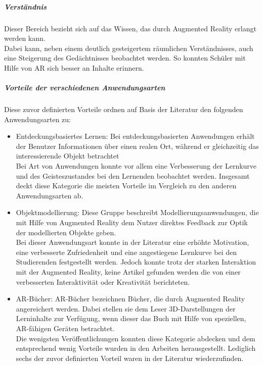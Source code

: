 \subparagraph{Verständnis}
Dieser Bereich bezieht sich auf das Wissen, das durch Augmented Reality erlangt werden kann.\\
Dabei kann, neben einem deutlich gesteigertem räumlichen Verständnisses, auch eine Steigerung des Gedächtnisses beobachtet werden. So konnten Schüler mit Hilfe von AR sich besser an Inhalte erinnern. \\
\citep[Kapitel 4.5]{diegmann:benefits-ar}

\subparagraph{Vorteile der verschiedenen Anwendungsarten}
Diese zuvor definierten Vorteile ordnen \citeauthor{diegmann:benefits-ar} auf Basis der Literatur den folgenden Anwendungsarten zu:
\begin{itemize}
\item Entdeckungsbasiertes Lernen: Bei entdeckungsbasierten Anwendungen erhält der Benutzer \glqq Informationen über einen realen Ort, während er gleichzeitig das interessierende Objekt betrachtet\grqq{} \citep[Kapitel 2.2]{diegmann:benefits-ar} \\
Bei Art von Anwendungen konnte vor allem eine Verbesserung der Lernkurve und des Geisteszustandes bei den Lernenden beobachtet werden. Insgesamt deckt diese Kategorie die meisten Vorteile im Vergleich zu den anderen Anwendungsarten ab. \citep[Kapitel 5]{diegmann:benefits-ar}
\item Objektmodellierung: Diese Gruppe beschreibt Modellierungsanwendungen, die mit Hilfe von Augmented Reality dem Nutzer direktes Feedback zur Optik der modellierten Objekte geben. \citep[Kapitel 2.2]{diegmann:benefits-ar} \\
Bei dieser Anwendungsart konnte in der Literatur eine erhöhte Motivation, eine verbesserte Zufriedenheit und eine angestiegene Lernkurve bei den Studierenden festgestellt werden. Jedoch konnte trotz der starken Interaktion mit der Augmented Reality, keine Artikel gefunden werden die von einer verbesserten Interaktivität oder Kreativität berichteten. \citep[Kapitel 5]{diegmann:benefits-ar}
\item AR-Bücher: AR-Bücher bezeichnen Bücher, die durch Augmented Reality angereichert werden. Dabei stellen sie dem Leser 3D-Darstellungen der Lerninhalte zur Verfügung, wenn dieser das Buch mit Hilfe von speziellen, AR-fähigen Geräten betrachtet. \citep[Kapitel 2.2]{diegmann:benefits-ar}\\
Die wenigsten Veröffentlichungen konnten diese Kategorie abdecken und dem entsprechend wenig Vorteile wurden in den Arbeiten herausgestellt. Lediglich sechs der zuvor definierten Vorteil waren in der Literatur wiederzufinden. \citep[Kapitel 5]{diegmann:benefits-ar}

\end{itemize}
